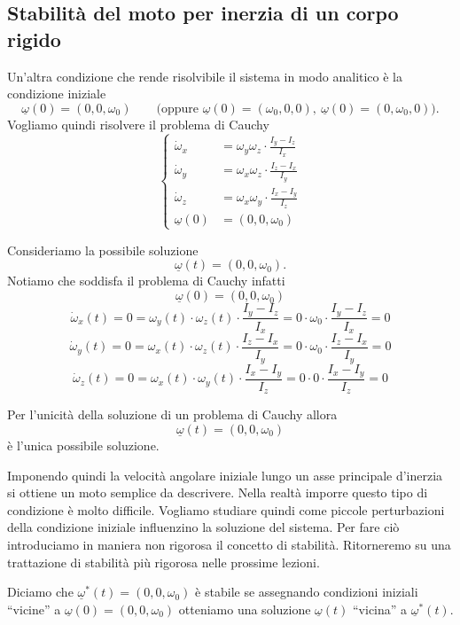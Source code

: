 \subsection{Stabilità del moto per inerzia di un corpo rigido}
Un'altra condizione che rende risolvibile il sistema in modo analitico è la condizione iniziale
\[
\underline{\omega}(0)=(0,0,\omega_0)
\qquad
\text{(oppure } \underline{\omega}(0)=(\omega_0,0,0),\ \underline{\omega}(0)=(0,\omega_0,0)\text{).}
\]
Vogliamo quindi risolvere il problema di Cauchy
\[
\left\{
\begin{aligned}
\dot{\omega}_x &= \omega_y\omega_z\cdot \frac{I_y-I_z}{I_x} \\
\dot{\omega}_y &= \omega_x\omega_z\cdot \frac{I_z-I_x}{I_y} \\
\dot{\omega}_z &= \omega_x\omega_y\cdot \frac{I_x-I_y}{I_z} \\
\underline{\omega}(0) &= (0,0,\omega_0)
\end{aligned}
\right.
\]

Consideriamo la possibile soluzione
\[
\underline{\omega}(t)=(0,0,\omega_0).
\]
Notiamo che soddisfa il problema di Cauchy infatti
\[
\underline{\omega}(0)=(0,0,\omega_0)
\]
\[
\dot{\omega}_x(t)=0=\omega_y(t)\cdot\omega_z(t)\cdot\frac{I_y-I_z}{I_x}
=0\cdot\omega_0\cdot\frac{I_y-I_z}{I_x}=0
\]
\[
\dot{\omega}_y(t)=0=\omega_x(t)\cdot\omega_z(t)\cdot\frac{I_z-I_x}{I_y}
=0\cdot\omega_0\cdot\frac{I_z-I_x}{I_y}=0
\]
\[
\dot{\omega}_z(t)=0=\omega_x(t)\cdot\omega_y(t)\cdot\frac{I_x-I_y}{I_z}
=0\cdot 0\cdot\frac{I_x-I_y}{I_z}=0
\]

Per l'unicità della soluzione di un problema di Cauchy allora
\[
\underline{\omega}(t)=(0,0,\omega_0)
\]
è l'unica possibile soluzione.


Imponendo quindi la velocità angolare iniziale lungo un asse principale d'inerzia si ottiene un moto semplice da descrivere.
Nella realtà imporre questo tipo di condizione è molto difficile. Vogliamo studiare quindi come piccole perturbazioni della condizione iniziale influenzino la soluzione del sistema. Per fare ciò introduciamo in maniera non rigorosa il concetto di stabilità. Ritorneremo su una trattazione di stabilità più rigorosa nelle prossime lezioni.

\begin{definition}{}
Diciamo che $\underline{\omega}^{*}(t)=(0,0,\omega_0)$ è stabile se assegnando condizioni iniziali ``vicine'' a $\underline{\omega}(0)=(0,0,\omega_0)$ otteniamo una soluzione $\underline{\omega}(t)$ ``vicina'' a $\underline{\omega}^{*}(t)$.
\end{definition}

